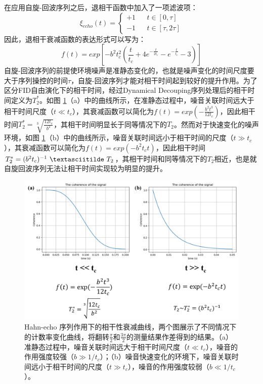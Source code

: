 \documentclass[type = bachelor]{whu-thesis}
\begin{document}
在应用自旋-回波序列之后，退相干函数中加入了一项滤波项：
\begin{equation}
  \xi_{echo}(t)=\left\{
  \begin{array}{rcl}
  +1 & & {t \in [0, \tau]}\\
  -1 & & {t \in [\tau, 2\tau]}
  \end{array} \right.
  \end{equation}
因此，退相干衰减函数的表达形式可以写为：
\begin{equation}
  f(t) = exp[-b^2t_c^2(\frac{t}{t_c}+4e^{-\frac{t}{2t_c}}-e^{-\frac{t}{t_c}}-3)]
\end{equation}
自旋-回波序列的前提使环境噪声是准静态变化的，也就是噪声变化的时间尺度要大于序列操控的时间$\tau$，自旋-回波序列才能对相干时间起到较好的提升作用。为了区分FID自由演化下的相干时间，经过Dynamical Decouping序列处理后的相干时间定义为$T_2^*$。如图 \ref{fig: Hahn Functions}（a）中的曲线所示，在准静态过程中，噪音关联时间远大于相干时间尺度（$t\ll t_c$），其衰减函数可以简化为$f(t) = exp(-\frac{b^2t^3}{12t_c})$，因此相干时间$T_2^*=\sqrt[3]{\frac{12t_c}{b^2}}$，其相干时间明显长于同等情况下的$T_2$。然而对于快速变化的噪声环境，如图 \ref{fig: Hahn Functions}（b）中的曲线所示，噪音关联时间远小于相干时间的尺度（$t\gg t_c$），其衰减函数可以简化为$f(t) = exp(-b^2t_ct)$，因此相干时间$T_2^*=(b^2t_c)^{-1}\ \textasciitilde \ T_2$，其相干时间和同等情况下的$T_2$相近，也是就自旋回波序列无法让相干时间实现较为明显的提升。
\begin{figure}
  \centering
  \includegraphics[width=1.0\textwidth]{figures/Chapter 1/Hahn Functions.png}
  \caption[Hahn-echo 序列作用下的相干性衰减曲线]{Hahn-echo 序列作用下的相干性衰减曲线，两个图展示了不同情况下的计数率变化曲线，将翻转$\frac{\pi}{2}$和$\frac{3\pi}{2}$的测量结果作差得到的结果。（a）准静态过程中，噪音关联时间远大于相干时间尺度（$t\ll t_c$），噪音的作用强度较强（$b\gg 1/t_c$）；（b）噪音快速变化的环境下，噪音关联时间远小于相干时间的尺度（$t\gg t_c$），噪音的作用强度较弱（$b\ll 1/t_c$）。}
  \label{fig: Hahn Functions}
\end{figure}
\end{document}
